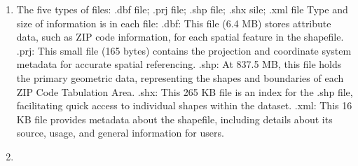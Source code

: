 \documentclass[
  letterpaper,
  DIV=11,
  numbers=noendperiod]{scrartcl}
\begin{document}
\begin{enumerate}
\def\labelenumi{\arabic{enumi}.}
\item
  The five types of files: .dbf file; .prj file; .shp file; .shx sile;
  .xml file Type and size of information is in each file: .dbf: This
  file (6.4 MB) stores attribute data, such as ZIP code information, for
  each spatial feature in the shapefile. .prj: This small file (165
  bytes) contains the projection and coordinate system metadata for
  accurate spatial referencing. .shp: At 837.5 MB, this file holds the
  primary geometric data, representing the shapes and boundaries of each
  ZIP Code Tabulation Area. .shx: This 265 KB file is an index for the
  .shp file, facilitating quick access to individual shapes within the
  dataset. .xml: This 16 KB file provides metadata about the shapefile,
  including details about its source, usage, and general information for
  users.
\item
\end{enumerate}
\end{document}
